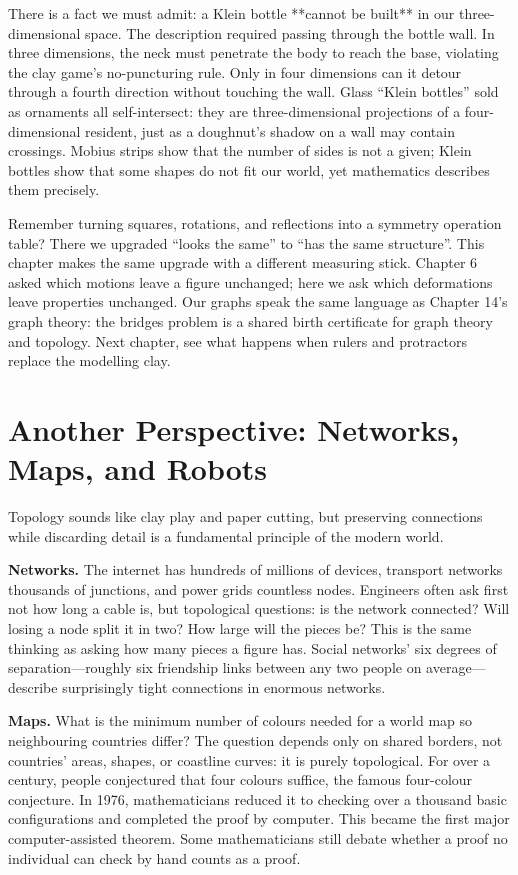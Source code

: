 There is a fact we must admit: a Klein bottle **cannot be built** in our three-dimensional space. The description required passing through the bottle wall. In three dimensions, the neck must penetrate the body to reach the base, violating the clay game's no-puncturing rule. Only in four dimensions can it detour through a fourth direction without touching the wall. Glass ``Klein bottles'' sold as ornaments all self-intersect: they are three-dimensional projections of a four-dimensional resident, just as a doughnut's shadow on a wall may contain crossings. Mobius strips show that the number of sides is not a given; Klein bottles show that some shapes do not fit our world, yet mathematics describes them precisely.

\begin{lianjie}
Remember turning squares, rotations, and reflections into a symmetry operation table? There we upgraded ``looks the same'' to ``has the same structure''. This chapter makes the same upgrade with a different measuring stick. Chapter 6 asked which motions leave a figure unchanged; here we ask which deformations leave properties unchanged. Our graphs speak the same language as Chapter 14's graph theory: the bridges problem is a shared birth certificate for graph theory and topology. Next chapter, see what happens when rulers and protractors replace the modelling clay.
\end{lianjie}

\section{Another Perspective: Networks, Maps, and Robots}

Topology sounds like clay play and paper cutting, but preserving connections while discarding detail is a fundamental principle of the modern world.

\textbf{Networks.} The internet has hundreds of millions of devices, transport networks thousands of junctions, and power grids countless nodes. Engineers often ask first not how long a cable is, but topological questions: is the network connected? Will losing a node split it in two? How large will the pieces be? This is the same thinking as asking how many pieces a figure has. Social networks' six degrees of separation---roughly six friendship links between any two people on average---describe surprisingly tight connections in enormous networks.

\textbf{Maps.} What is the minimum number of colours needed for a world map so neighbouring countries differ? The question depends only on shared borders, not countries' areas, shapes, or coastline curves: it is purely topological. For over a century, people conjectured that four colours suffice, the famous four-colour conjecture. In 1976, mathematicians reduced it to checking over a thousand basic configurations and completed the proof by computer. This became the first major computer-assisted theorem. Some mathematicians still debate whether a proof no individual can check by hand counts as a proof.

